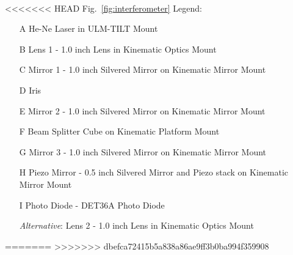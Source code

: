 \begin{figure}[ht!]
\centering
{}\hspace{.01\linewidth} \\
 \hspace{.01\linewidth}
\end{figure}
<<<<<<< HEAD
\newpage
Fig.~\ref{fig:interferometer} Legend:
\begin{enumerate} \itemsep1pt \parskip0pt 
   \item[A] He-Ne Laser in ULM-TILT Mount
   \item[B] Lens 1 - 1.0 inch Lens in Kinematic Optics Mount
   \item[C] Mirror 1 - 1.0 inch Silvered Mirror on Kinematic Mirror Mount
   \item[D] Iris
   \item[E] Mirror 2 - 1.0 inch Silvered Mirror on Kinematic Mirror Mount
   \item[F] Beam Splitter Cube on Kinematic Platform Mount
   \item[G] Mirror 3 - 1.0 inch Silvered Mirror on Kinematic Mirror Mount
   \item[H] Piezo Mirror - 0.5 inch Silvered Mirror and Piezo stack on Kinematic Mirror Mount
   \item[I] Photo Diode - DET36A Photo Diode

    \emph{Alternative}: Lens 2 - 1.0 inch Lens in Kinematic Optics Mount
\end{enumerate}
=======
>>>>>>> dbefca72415b5a838a86ae9ff3b0ba994f359908
